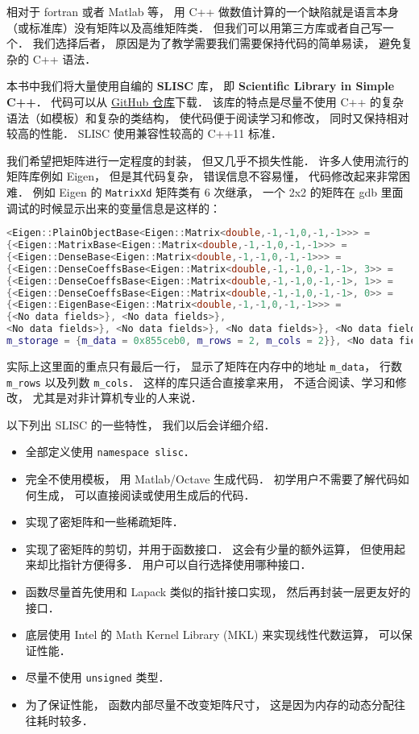 

相对于 fortran 或者 Matlab 等， 用 C++ 做数值计算的一个缺陷就是语言本身（或标准库）没有矩阵以及高维矩阵类． 但我们可以用第三方库或者自己写一个． 我们选择后者， 原因是为了教学需要我们需要保持代码的简单易读， 避免复杂的 C++ 语法．

本书中我们将大量使用自编的 \textbf{SLISC} 库， 即 \textbf{Scientific Library in Simple C++}． 代码可以从 \href{https://github.com/MacroUniverse/SLISC0}{GitHub 仓库}下载． 该库的特点是尽量不使用 C++ 的复杂语法（如模板）和复杂的类结构， 使代码便于阅读学习和修改， 同时又保持相对较高的性能． SLISC 使用兼容性较高的 C++11 标准．

我们希望把矩阵进行一定程度的封装， 但又几乎不损失性能． 许多人使用流行的矩阵库例如 Eigen， 但是其代码复杂， 错误信息不容易懂， 代码修改起来非常困难． 例如 Eigen 的 \verb|MatrixXd| 矩阵类有 6 次继承， 一个 2x2 的矩阵在 gdb 里面调试的时候显示出来的变量信息是这样的：
\begin{lstlisting}[language=cpp]
<Eigen::PlainObjectBase<Eigen::Matrix<double,-1,-1,0,-1,-1>>> = 
{<Eigen::MatrixBase<Eigen::Matrix<double,-1,-1,0,-1,-1>>> = 
{<Eigen::DenseBase<Eigen::Matrix<double,-1,-1,0,-1,-1>>> = 
{<Eigen::DenseCoeffsBase<Eigen::Matrix<double,-1,-1,0,-1,-1>, 3>> = 
{<Eigen::DenseCoeffsBase<Eigen::Matrix<double,-1,-1,0,-1,-1>, 1>> = 
{<Eigen::DenseCoeffsBase<Eigen::Matrix<double,-1,-1,0,-1,-1>, 0>> = 
{<Eigen::EigenBase<Eigen::Matrix<double,-1,-1,0,-1,-1>>> =
{<No data fields>}, <No data fields>}, 
<No data fields>}, <No data fields>}, <No data fields>}, <No data fields>},
m_storage = {m_data = 0x855ceb0, m_rows = 2, m_cols = 2}}, <No data fields>
\end{lstlisting}
实际上这里面的重点只有最后一行， 显示了矩阵在内存中的地址 \verb|m_data|， 行数 \verb|m_rows| 以及列数 \verb|m_cols|． 这样的库只适合直接拿来用， 不适合阅读、学习和修改， 尤其是对非计算机专业的人来说．

以下列出 SLISC 的一些特性， 我们以后会详细介绍．
\begin{itemize}
\item 全部定义使用 \verb|namespace slisc|．
\item 完全不使用模板， 用 Matlab/Octave 生成代码． 初学用户不需要了解代码如何生成， 可以直接阅读或使用生成后的代码．
\item 实现了密矩阵和一些稀疏矩阵．
\item 实现了密矩阵的剪切，并用于函数接口． 这会有少量的额外运算， 但使用起来却比指针方便得多． 用户可以自行选择使用哪种接口．
\item 函数尽量首先使用和 Lapack 类似的指针接口实现， 然后再封装一层更友好的接口．
\item 底层使用 Intel 的 Math Kernel Library (MKL) 来实现线性代数运算， 可以保证性能．
\item 尽量不使用 \verb|unsigned| 类型．
\item 为了保证性能， 函数内部尽量不改变矩阵尺寸， 这是因为内存的动态分配往往耗时较多．
\end{itemize}

